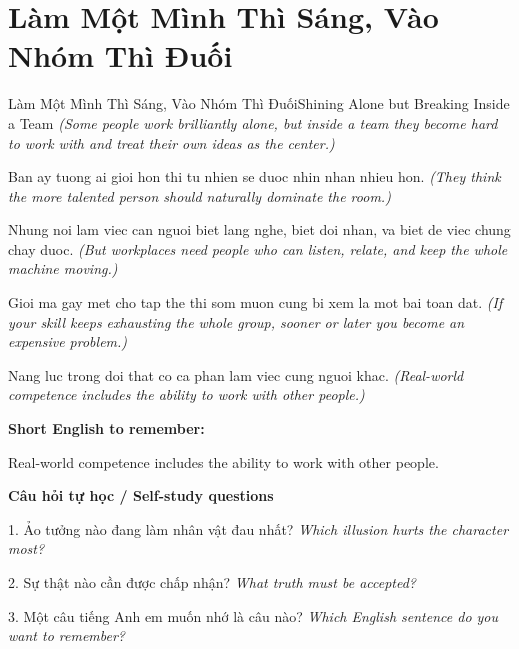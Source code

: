 \section{Làm Một Mình Thì Sáng, Vào Nhóm Thì Đuối}
\begin{truyen}{Làm Một Mình Thì Sáng, Vào Nhóm Thì Đuối}{Shining Alone but Breaking Inside a Team}
\textit{(Some people work brilliantly alone, but inside a team they become hard to work with and treat their own ideas as the center.)}

Ban ay tuong ai gioi hon thi tu nhien se duoc nhin nhan nhieu hon.
\textit{(They think the more talented person should naturally dominate the room.)}

Nhung noi lam viec can nguoi biet lang nghe, biet doi nhan, va biet de viec chung chay duoc.
\textit{(But workplaces need people who can listen, relate, and keep the whole machine moving.)}

Gioi ma gay met cho tap the thi som muon cung bi xem la mot bai toan dat.
\textit{(If your skill keeps exhausting the whole group, sooner or later you become an expensive problem.)}

\end{truyen}

\begin{baihoc}
Nang luc trong doi that co ca phan lam viec cung nguoi khac.
\textit{(Real-world competence includes the ability to work with other people.)}
\end{baihoc}

\begin{ghinhoanh}
\textbf{Short English to remember:}

Real-world competence includes the ability to work with other people.

\end{ghinhoanh}

\begin{tuhocnhanh}
\textbf{Câu hỏi tự học / Self-study questions}

1. Ảo tưởng nào đang làm nhân vật đau nhất? \textit{Which illusion hurts the character most?}

2. Sự thật nào cần được chấp nhận? \textit{What truth must be accepted?}

3. Một câu tiếng Anh em muốn nhớ là câu nào? \textit{Which English sentence do you want to remember?}
\end{tuhocnhanh}
\ngancach

